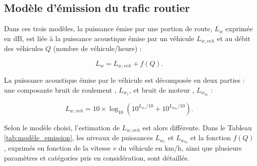 \subsection{Modèle d'émission du trafic routier}\label{part:modele_emission}

Dans ces trois modèles, la puissance émise par une portion de route, $L_w$ exprimée en dB, est liée à la puissance acoustique émise par un véhicule $L_{w,veh}$ et au débit des véhicules $Q$ (nombre de véhicule/heure) :

\begin{equation}
L_w = L_{w,veh} + f(Q).
\end{equation}

La puissance acoustique émise par le véhicule est décomposée en deux parties : une composante \og bruit de roulement \fg{}, $L_{w_r}$, et \og bruit de moteur \fg{}, $L_{w_m}$ :

\begin{equation}
L_{w,veh} = 10\times \log_{10} \left(10^{L_{w_r}/10}+10^{L_{w_m}/10}\right).
\end{equation}

Selon le modèle choisi, l'estimation de $L_{w,veh}$ est alors différente. Dans le Tableau \ref{tab:modèle_emission}, les niveaux de puissances $L_{w_r}$ et $L_{w_m}$ et la fonction $f(Q)$, exprimés en fonction de la vitesse $v$ du véhicule en km/h, ainsi que plusieurs paramètres et catégories pris en considération, sont détaillés.

